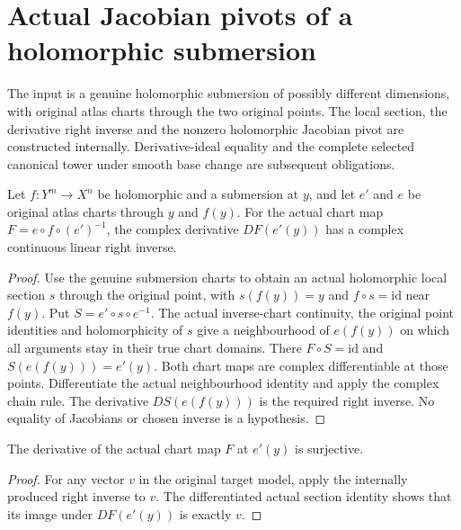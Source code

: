 \section{Actual Jacobian pivots of a holomorphic submersion}

The input is a genuine holomorphic submersion of possibly different dimensions,
with original atlas charts through the two original points. The local section,
the derivative right inverse and the nonzero holomorphic Jacobian pivot are
constructed internally. Derivative-ideal equality and the complete selected
canonical tower under smooth base change are subsequent obligations.

\begin{lemma}\label{hir:submersion-chart-derivative-right-inverse}
Let $f:Y^m\to X^n$ be holomorphic and a submersion at $y$, and let $e'$ and $e$
be original atlas charts through $y$ and $f(y)$. For the actual chart map
$F=e\circ f\circ(e')^{-1}$, the complex derivative $DF(e'(y))$ has a complex
continuous linear right inverse.
\leanok
{}
\end{lemma}
\begin{proof}
Use the genuine submersion charts to obtain an actual holomorphic local section
$s$ through the original point, with $s(f(y))=y$ and $f\circ s=\mathrm{id}$
near $f(y)$. Put $S=e'\circ s\circ e^{-1}$. The actual inverse-chart continuity,
the original point identities and holomorphicity of $s$ give a neighbourhood
of $e(f(y))$ on which all arguments stay in their true chart domains. There
$F\circ S=\mathrm{id}$ and $S(e(f(y)))=e'(y)$. Both chart maps are complex
differentiable at those points. Differentiate the actual neighbourhood identity
and apply the complex chain rule. The derivative $DS(e(f(y)))$ is the required
right inverse. No equality of Jacobians or chosen inverse is a hypothesis.
\end{proof}

\begin{lemma}\label{hir:submersion-chart-derivative-surjective}
The derivative of the actual chart map $F$ at $e'(y)$ is surjective.
\leanok
{}
\end{lemma}
\begin{proof}
For any vector $v$ in the original target model, apply the internally produced
right inverse to $v$. The differentiated actual section identity shows that
its image under $DF(e'(y))$ is exactly $v$.
\end{proof}

